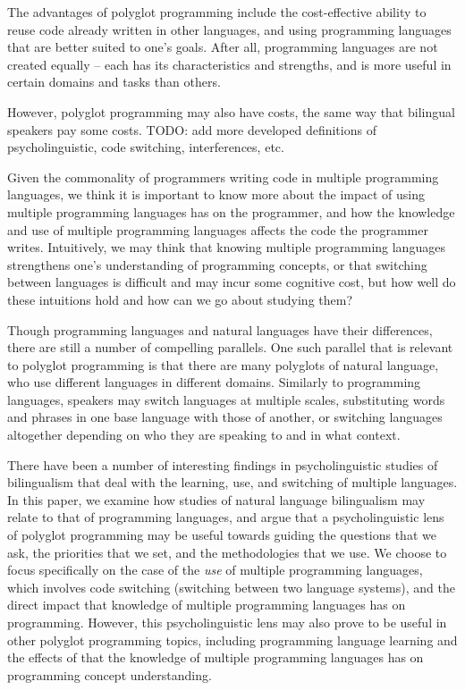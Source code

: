 \documentclass[a4paper,UKenglish,cleveref, autoref]{oasics-v2019}
\begin{document}
The advantages of polyglot programming include the cost-effective ability to reuse code already written in other languages, and using programming languages that are better suited to one’s goals. After all, programming languages are not created equally -- each has its characteristics and strengths, and is more useful in certain domains and tasks than others. 

However, polyglot programming may also have costs, the same way that bilingual speakers pay some costs. TODO: add more developed definitions of psycholinguistic, code switching, interferences, etc. 


Given the commonality of programmers writing code in multiple programming languages, we think it is important to know more about the impact of using multiple programming languages has on the programmer, and how the knowledge and use of multiple programming languages affects the code the programmer writes. Intuitively, we may think that knowing multiple programming languages strengthens one’s understanding of programming concepts, or that switching between languages is difficult and may incur some cognitive cost, but how well do these intuitions hold and how can we go about studying them? 

Though programming languages and natural languages have their differences, there are still a number of compelling parallels. One such parallel that is relevant to polyglot programming is that there are many polyglots of natural language, who use different languages in different domains. Similarly to programming languages, speakers may switch languages at multiple scales, substituting words and phrases in one base language with those of another, or switching languages altogether depending on who they are speaking to and in what context. 

There have been a number of interesting findings in psycholinguistic studies of bilingualism that deal with the learning, use, and switching of multiple languages. In this paper, we examine how studies of natural language bilingualism may relate to that of programming languages, and argue that a psycholinguistic lens of polyglot programming may be useful towards guiding the questions that we ask, the priorities that we set, and the methodologies that we use. We choose to focus specifically on the case of the \textit{use} of multiple programming languages, which involves code switching (switching between two language systems), and the direct impact that knowledge of multiple programming languages has on programming. However, this psycholinguistic lens may also prove to be useful in other polyglot programming topics, including programming language learning and the effects of that the knowledge of multiple programming languages has on programming concept understanding. 
\end{document}
